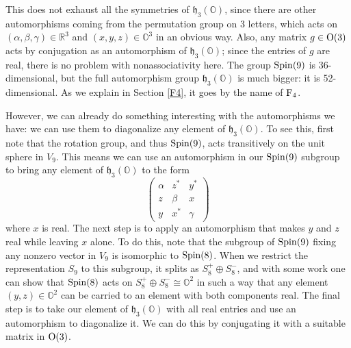 \documentclass[12pt]{article}
\newcommand\R{{\mathbb R}}
\renewcommand\O{{\mathbb O}}
\newcommand{\OO}{{\rm O}}
\newcommand{\Spin}{{\rm Spin}}
\newcommand{\F}{{\rm F}}
\newcommand{\h}{{\mathfrak {h}}}
\newcommand{\iso}{\cong}
\begin{document}
This does not exhaust all the symmetries of $\h_3(\O)$, since there are 
other automorphisms coming from the permutation group on 3 letters, 
which acts on $(\alpha,\beta,\gamma) \in \R^3$ and $(x,y,z) \in \O^3$ in 
an obvious way.  Also, any matrix $g \in \OO(3)$ acts by conjugation as 
an automorphism of $\h_3(\O)$; since the entries of $g$ are real, there 
is no problem with nonassociativity here.   The group $\Spin(9)$ is 
36-dimensional, but the full automorphism group $\h_3(\O)$ is much  
bigger: it is 52-dimensional.  As we explain in Section \ref{F4}, it 
goes by the name of $\F_4$. 

However, we can already do something interesting with the automorphisms 
we have: we can use them to diagonalize any element of $\h_3(\O)$.   To 
see this, first note that the rotation group, and thus $\Spin(9)$, acts 
transitively on the unit sphere in $V_9$.  This means we can use an  
automorphism in our $\Spin(9)$ subgroup to bring any element of $\h_3(\O)$ 
to the form 
\[ 
\left( \begin{array}{ccc}  
                         \alpha  &  z^*  & y^*         \\  
                         z       & \beta & x           \\ 
                         y       & x^* & \gamma   \end{array} \right)  
\]  
where $x$ is real.   The next step is to apply an automorphism 
that makes $y$ and $z$ real while leaving $x$ alone.  To do this, note 
that the subgroup of $\Spin(9)$ fixing any nonzero vector in $V_9$ is 
isomorphic to $\Spin(8)$.  When we restrict the representation $S_9$ to 
this subgroup, it splits as $S_8^+ \oplus S_8^-$, and with some work 
\cite{Harvey} one can show that $\Spin(8)$ acts on $S_8^+ \oplus S_8^- 
\iso \O^2$ in such a way that any element $(y,z) \in \O^2$ can be 
carried to an element with both components real.  The final step is to 
take our element of $\h_3(\O)$ with all real entries and use an 
automorphism to diagonalize it.  We can do this by conjugating it with a 
suitable matrix in $\OO(3)$.   
 
\end{document}
